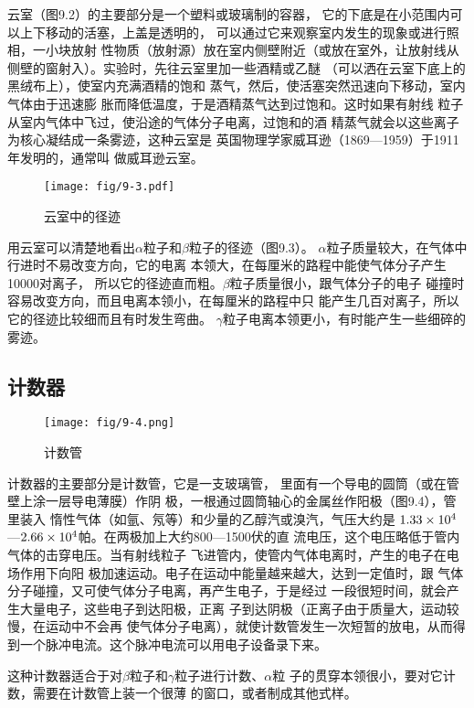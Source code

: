 云室（图9.2）的主要部分是一个塑料或玻璃制的容器，
它的下底是在小范围内可以上下移动的活塞，上盖是透明的，
可以通过它来观察室内发生的现象或进行照相，一小块放射
性物质（放射源）放在室内侧壁附近（或放在室外，让放射线从
侧壁的窗射入）。实验时，先往云室里加一些酒精或乙醚
（可以洒在云室下底上的黑绒布上），使室内充满酒精的饱和
蒸气，然后，使活塞突然迅速向下移动，室内气体由于迅速膨
胀而降低温度，于是酒精蒸气达到过饱和。这时如果有射线
粒子从室内气体中飞过，使沿途的气体分子电离，过饱和的酒
精蒸气就会以这些离子为核心凝结成一条雾迹，这种云室是
英国物理学家威耳逊（1869—1959）于1911年发明的，通常叫
做威耳逊云室。

\begin{figure}[htp]
    \centering
    \texttt{[image: fig/9-3.pdf]}
    \caption{云室中的径迹}
\end{figure}

用云室可以清楚地看出$\alpha$粒子和$\beta$粒子的径迹（图9.3）。
$\alpha$粒子质量较大，在气体中行进时不易改变方向，它的电离
本领大，在每厘米的路程中能使气体分子产生10000对离子，
所以它的径迹直而粗。$\beta$粒子质量很小，跟气体分子的电子
碰撞时容易改变方向，而且电离本领小，在每厘米的路程中只
能产生几百对离子，所以它的径迹比较细而且有时发生弯曲。
$\gamma$粒子电离本领更小，有时能产生一些细碎的雾迹。



\subsection{计数器}
\begin{figure}[htp]\centering
\texttt{[image: fig/9-4.png]}
\caption{计数管}
\end{figure}

计数器的主要部分是计数管，它是一支玻璃管，
里面有一个导电的圆筒（或在管壁上涂一层导电薄膜）作阴
极，一根通过圆筒轴心的金属丝作阳极（图9.4），管里装入
惰性气体（如氩、氖等）和少量的乙醇汽或溴汽，气压大约是
$1.33\times10^4$—$2.66\times10^4$帕。在两极加上大约800—1500伏的直
流电压，这个电压略低于管内气体的击穿电压。当有射线粒子
飞进管内，使管内气体电离时，产生的电子在电场作用下向阳
极加速运动。电子在运动中能量越来越大，达到一定值时，跟
气体分子碰撞，又可使气体分子电离，再产生电子，于是经过
一段很短时间，就会产生大量电子，这些电子到达阳极，正离
子到达阴极（正离子由于质量大，运动较慢，在运动中不会再
使气体分子电离），就使计数管发生一次短暂的放电，从而得
到一个脉冲电流。这个脉冲电流可以用电子设备录下来。

这种计数器适合于对$\beta$粒子和$\gamma$粒子进行计数、$\alpha$粒
子的贯穿本领很小，要对它计数，需要在计数管上装一个很薄
的窗口，或者制成其他式样。

